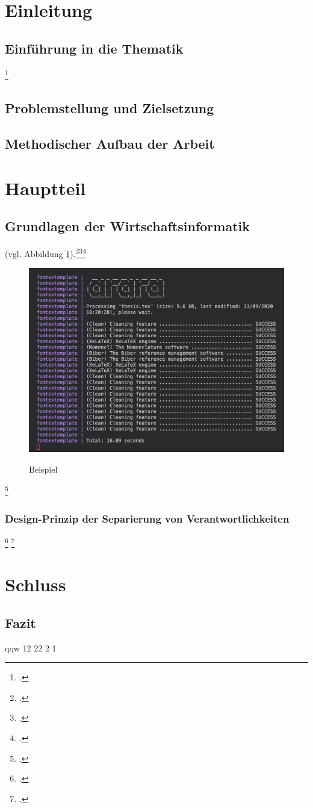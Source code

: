\section{Einleitung}
\subsection{Einführung in die Thematik}
\blindtext{}
\blindtext\footcite[Vgl. ][]{mswpf}

\subsection{Problemstellung und Zielsetzung}
\blindtext

\subsection{Methodischer Aufbau der Arbeit}
\blindtext

\section{Hauptteil}
\subsection{Grundlagen der Wirtschaftsinformatik}
\blindtext (vgl. Abbildung \ref{abb_bsp}).\footcite[Vgl. ][]{msdatabind}\footcite[Vgl. ][]{Atypisch}\footcite[Vgl. ][34]{Digitaloekonomie}
\blindenumerate
\Blindtext
\begin{figure} [!htb]
    \raggedright\caption{Beispiel}
    \includegraphics[width=1\textwidth]{.github/terminal}
    \captionsetup{width=1\textwidth}
    \label{abb_bsp}
\end{figure}
\blindtext\footcite[Vgl. ][415-426]{Tanenbaum2016}

\subsubsection{Design-Prinzip der Separierung von Verantwortlichkeiten}
\blindtext\footcite[Vgl. ][79]{Schelinski2019}
\blinditemize
\Blindtext\footcite[Vgl. ][34]{Digitaloekonomie}

\section{Schluss}
\subsection{Fazit}
\Blindtext


qqw
12
22
2
1